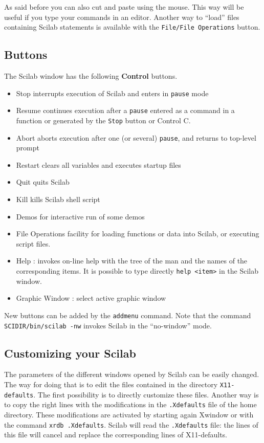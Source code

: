 As said before you can also cut and paste using the mouse. This way will be
useful if you type your commands in an editor. Another way to 
``load'' files containing Scilab statements
is available with the {\tt File/File Operations} button.

\subsection{Buttons}
The Scilab window has the following {\bf Control} buttons.\\

%
\begin{itemize}
\item Stop     interrupts execution of Scilab and enters in 
{\tt pause} mode
\item Resume    continues execution after a {\tt pause}
entered as a command in a function or generated by the {\tt Stop}
button or Control C.
\item Abort     aborts execution after one (or several) {\tt pause}, 
and returns to top-level prompt
\item Restart   clears all variables and executes startup files
\item Quit      quits Scilab
\item Kill      kills Scilab shell script
\item Demos     for interactive run of some demos
\item File Operations   facility for loading functions or data into
Scilab, or executing script files. 
\item Help : invokes on-line help with the tree of the man and the 
names of the corresponding items. It is possible to type directly 
{\tt help <item>} in the Scilab window.
\item Graphic Window : select active graphic window
\end{itemize}
%
New buttons can be added by the 
{\tt addmenu} command.
Note that the command {\tt SCIDIR/bin/scilab -nw} invokes Scilab
in the ``no-window'' mode.

\subsection{Customizing your Scilab}


The parameters of the different windows opened by 
Scilab can be easily changed. The way for doing that is to edit the files 
contained in the directory {\tt X11-defaults}. The first possibility is 
to directly customize these files. Another way is to copy 
the right lines with the modifications in the {\tt .Xdefaults} 
file of the home directory.
These modifications are activated by starting again Xwindow or with the
command {\tt xrdb .Xdefaults}. Scilab will read the {\tt .Xdefaults} file: 
the lines of this
file will cancel and replace the corresponding lines of X11-defaults.

